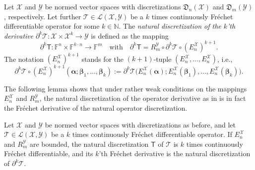 \documentclass[a4paper]{paper}
\newcommand{\Discr}{\mathfrak{D}}
\newcommand{\Spc}[1]{\mathscr{#1}}
\newcommand{\Field}{\mathbb{F}}
\newcommand{\Natural}{\mathbb{N}}
\newcommand{\Op}[1]{\mathcal{#1}}
\newcommand{\DiscOp}[1]{\mathsf{#1}}
\newcommand*{\EXT}[2]{\ensuremath{E_{#1}^{#2}}}
\newcommand*{\REST}[2]{\ensuremath{R_{#1}^{#2}}}
\newcommand*{\RmY}{\ensuremath{\REST{m}{\Spc{Y}}}}
\newcommand*{\EnX}{\ensuremath{\EXT{n}{\Spc{X}}}}
\newcommand{\valpha}{\boldsymbol{\alpha}}
\newcommand{\vbeta}{\boldsymbol{\beta}}
\begin{document}
\begin{definition}
 \label{def:discr:operator:op_deriv:operator_deriv_discr}
 Let $\Spc{X}$ and $\Spc{Y}$ be normed vector spaces with discretizations $\Discr_n(\Spc{X})$ and $\Discr_m(\Spc{Y})$, 
 respectively. Let further $\Op{T} \in \Spc{L}(\Spc{X}, \Spc{Y})$ be a $k$ times continuously Fr\'{e}chet 
 differentiable operator for some $k \in  \Natural$. The \emph{natural discretization of the $k$'th derivative} 
 $\partial^k \Op{T} \colon \Spc{X} \times \Spc{X}^k \to \Spc{Y}$ is defined as the mapping
 \begin{equation*}
  \partial^k \DiscOp{T} \colon \Field^n \times \Field^{k\cdot n} \to \Field^m
  \quad \text{with} \quad
  \partial^k \DiscOp{T} = \RmY \circ \partial^k \Op{T} \circ (\EnX)^{k+1}.
 \end{equation*}
 The notation $(\EnX)^{k+1}$ stands for the $(k+1)$-tuple $(\EnX, \ldots, \EnX)$, i.e., 
 \begin{equation*}
  \partial^k \Op{T} \circ (\EnX)^{k+1}(\valpha; \vbeta_1, \ldots, \vbeta_k) :=
 \partial^k \Op{T}\big( \EnX(\valpha); \EnX(\vbeta_1), \ldots, \EnX(\vbeta_k) \big).
 \end{equation*}
\end{definition}


The following lemma shows that under rather weak conditions on the mappings $E_n^{\Spc{X}}$ and $R_m^{\Spc{Y}}$, the 
natural discretization of the operator derivative as in  is in 
fact the Fr\'{e}chet derivative of the natural operator discretization.


\begin{lemma}
 \label{lemma:discr:operator:op_deriv:natural_is_deriv}
 Let $\Spc{X}$ and $\Spc{Y}$ be normed vector spaces with discretizations as before, and let 
 $\Op{T} \in \Spc{L}(\Spc{X}, \Spc{Y})$ be a $k$ times continuously Fr\'{e}chet differentiable 
 operator. If $E_n^{\Spc{X}}$ and $R_m^{\Spc{Y}}$ are bounded, the natural discretization $\DiscOp{T}$ of $\Op{T}$ is 
 $k$ times  continuously Fr\'{e}chet differentiable, and its $k$'th Fr\'{e}chet derivative is the natural 
 discretization of $\partial^k\Op{T}$.
\end{lemma}
\vspace{1em}
\end{document}
